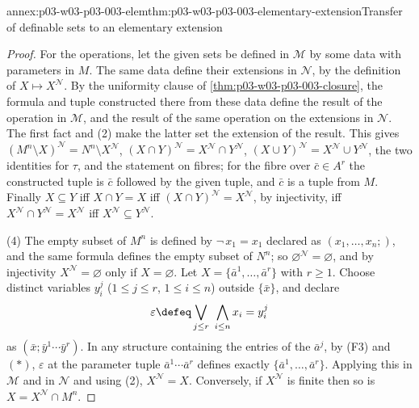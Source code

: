 \begin{annexitem}{annex:p03-w03-p03-003-elem}{thm:p03-w03-p03-003-elementary-extension}{Transfer of definable sets to an elementary extension}
\begin{proof}
For the operations, let the given sets be defined in \(\mathcal M\) by
some data with parameters in \(M\).  The same data define their extensions
in \(\mathcal N\), by the definition of \(X\mapsto X^{\mathcal N}\).  By the
uniformity clause of \cref{thm:p03-w03-p03-003-closure}, the formula and
tuple constructed there from these data define the result of the operation
in \(\mathcal M\), and the result of the same operation on the extensions in
\(\mathcal N\).  The first fact and (2) make the latter set the extension of
the result.  This gives
\((M^n\setminus X)^{\mathcal N}=N^n\setminus X^{\mathcal N}\),
\((X\cap Y)^{\mathcal N}=X^{\mathcal N}\cap Y^{\mathcal N}\),
\((X\cup Y)^{\mathcal N}=X^{\mathcal N}\cup Y^{\mathcal N}\), the two
identities for \(\tau\), and the statement on fibres; for the fibre over
\(\bar c\in A^r\) the constructed tuple is \(\bar c\) followed by the given
tuple, and \(\bar c\) is a tuple from \(M\).  Finally \(X\subseteq Y\) iff
\(X\cap Y=X\) iff \((X\cap Y)^{\mathcal N}=X^{\mathcal N}\), by
injectivity, iff \(X^{\mathcal N}\cap Y^{\mathcal N}=X^{\mathcal N}\) iff
\(X^{\mathcal N}\subseteq Y^{\mathcal N}\).

(4) The empty subset of \(M^n\) is defined by \(\neg\,x_1=x_1\) declared as
\((x_1,\ldots,x_n;)\), and the same formula defines the empty subset of
\(N^n\); so \(\varnothing^{\mathcal N}=\varnothing\), and by injectivity
\(X^{\mathcal N}=\varnothing\) only if \(X=\varnothing\).  Let
\(X=\{\bar a^1,\ldots,\bar a^r\}\) with \(r\geq1\).  Choose distinct
variables \(y^j_i\) (\(1\leq j\leq r\), \(1\leq i\leq n\)) outside
\(\{\bar x\}\), and declare
\[
 \varepsilon\defeq\bigvee_{j\leq r}\ \bigwedge_{i\leq n}x_i=y^j_i
\]
as \((\bar x;\bar y^1\cdots\bar y^r)\).  In any structure containing the
entries of the \(\bar a^j\), by (F3) and \((\ast)\),
\(\varepsilon\) at the parameter tuple \(\bar a^1\cdots\bar a^r\) defines
exactly \(\{\bar a^1,\ldots,\bar a^r\}\).  Applying this in \(\mathcal M\)
and in \(\mathcal N\) and using (2), \(X^{\mathcal N}=X\).  Conversely, if
\(X^{\mathcal N}\) is finite then so is \(X=X^{\mathcal N}\cap M^n\).
\end{proof}
\end{annexitem}
